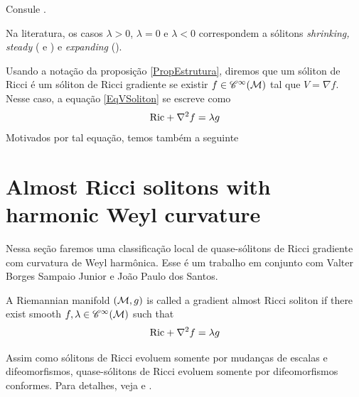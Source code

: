   \begin{demm}
    Consule .
  \end{demm}



  \begin{oobs}
    Na literatura, os casos $\lambda > 0$, $\lambda = 0$ e $\lambda < 0$ correspondem a sólitons \emph{shrinking, steady} ( e ) e \emph{expanding} ().
    \end{oobs}


    \begin{oobs}\label{OGradSoliton}
      Usando a notação da proposição \cref{PropEstrutura}, diremos que um sóliton de Ricci é um sóliton de Ricci gradiente se existir $f \in \mathscr{C}^{\infty}(\mathcal{M})$ tal que $V = \nabla f$. Nesse caso, a equação \cref{EqVSoliton} se escreve como
      \begin{equation}\label{GradSoliton}
      \mathrm{Ric} + \nabla^2 f = \lambda g
      \end{equation}
      Motivados por tal equação, temos também a seguinte
      \end{oobs}
      

\section{Almost Ricci solitons with harmonic Weyl curvature}
      Nessa seção faremos uma classificação local de quase-sólitons de Ricci gradiente com curvatura de Weyl harmônica. Esse é um trabalho em conjunto com Valter Borges Sampaio Junior e João Paulo dos Santos.
      \begin{deff}\label{DefAlmostGradSoliton}
      A Riemannian manifold $\left(\mathcal{M}, g\right)$ is called a gradient almost Ricci soliton  if there exist smooth $f, \lambda \in \mathscr{C}^{\infty}(\mathcal{M})$ such that 
      \begin{equation}\label{AlmostGradSoliton}
      \mathrm{Ric} + \nabla^2 f = \lambda g
      \end{equation}
      \end{deff}

      \begin{oobs}
        Assim como sólitons de Ricci evoluem somente por mudanças de escalas e difeomorfismos, quase-sólitons de Ricci evoluem somente por difeomorfismos conformes. Para detalhes, veja  e .
        \end{oobs}

